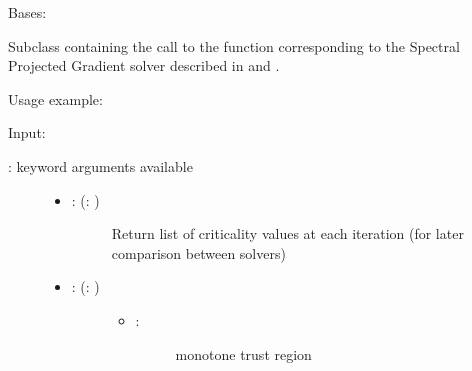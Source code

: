 \documentclass[a4paper,10pt,english]{sphinxmanual}
\begin{document}

\begin{fulllineitems}
\label{\detokenize{skprocrustes:skprocrustes.SPGSolver}}
Bases: 

Subclass containing the call to the  function 
corresponding to the Spectral Projected Gradient solver described in 
\label{\detokenize{skprocrustes:id3}}{\hyperref[\detokenize{skprocrustes:franbaza12}]{\sphinxcrossref{{[}FB12{]}}}} and \label{\detokenize{skprocrustes:id4}}{\hyperref[\detokenize{skprocrustes:franbazawebe17}]{\sphinxcrossref{{[}FBM17{]}}}}.

Usage example:

\begin{sphinxVerbatim}[commandchars=\\\{\}]
  
  
\end{sphinxVerbatim}

Input:
\begin{description}
\item[{: keyword arguments available}] \leavevmode\begin{itemize}
\item {} \begin{description}
\item[{: (: )}] \leavevmode
Return list of criticality values at each iteration (for later
comparison between solvers)

\end{description}

\item {} \begin{description}
\item[{: (: )}] \leavevmode\begin{itemize}
\item {} \begin{description}
\item[{: }] \leavevmode
monotone trust region


\end{description}
\end{itemize}
\end{description}
\end{itemize}
\end{description}
\end{fulllineitems}
\end{document}
